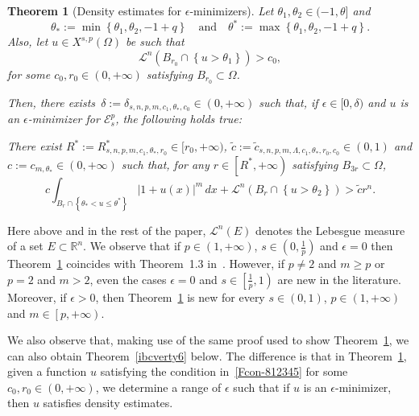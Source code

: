 \documentclass[12pt]{article}
\newcommand{\R}{\mathbb{R}}
\numberwithin{equation}{section}
\newtheorem{thm}{Theorem}[section]
\renewcommand{\leq}{\leqslant}
\renewcommand{\geq}{\geqslant}
\begin{document}
\begin{thm}[Density estimates for $\epsilon$-minimizers]\label{th:fracp>=2}
Let $\theta_1,\theta_2\in (-1,\theta]$ and 
\begin{equation}\label{liibfdcvre5555}
\theta_*:=\min \left\lbrace \theta_1,\theta_2,-1+q \right\rbrace\quad\mbox{and}\quad \theta^*:=\max\left\lbrace  \theta_1,\theta_2,-1+q\right\rbrace.
\end{equation}
Also, let $u\in X^{s,p}(\Omega)$ be such that
\begin{equation}\label{Fcon-812345}
\mathcal{L}^{n}(B_{r_0}\cap \left\lbrace u>\theta_1 \right\rbrace)>c_0,
\end{equation}
for some $c_0,r_0\in (0,+\infty)$ satisfying $B_{r_0}\subset \Omega$.

Then, there exists~$\delta:=\delta_{s,n,p,m,c_1,\theta_*,c_0}\in(0,+\infty)$ such that, if $\epsilon\in [0,\delta)$ and $u$ is an $\epsilon$-minimizer for $\mathcal{E}_s^p$, the following holds true:

There exist $R^*:=R_{s,n,p,m,c_1,\theta_*,r_0}^*\in [r_0,+\infty)$, $\tilde{c}:=\tilde{c}_{s,n,p,m,\Lambda,c_1,\theta_*,r_0,c_0}\in (0,1)$ and $c:=c_{m,\theta_*}\in (0,+\infty)$ such that, for any $r\in \left[R^*,+\infty\right)$ satisfying $B_{3r}\subset \Omega$,
\begin{equation}\label{benz}
c\int_{B_r\cap \left\lbrace \theta_{*}<u\leq \theta^* \right\rbrace}\left|1+u(x)\right|^m\,dx+\mathcal{L}^n(B_r\cap \left\lbrace u>\theta_2 \right\rbrace)>\tilde{c}r^n.
\end{equation}
\end{thm}

Here above and in the rest of the paper, $\mathcal{L}^n(E)$ denotes the Lebesgue measure of a set $E \subset \R^n$. We observe that if $p\in (1,+\infty)$, $s\in \left(0,\frac{1}{p}\right)$ and $\epsilon=0$ then Theorem~\ref{th:fracp>=2} coincides with Theorem~1.3 in~\cite{DFVERPP}. However, if $p\neq 2$ and $m\geq p$ or $p=2$ and $m>2$, even the cases $\epsilon=0$ and $s\in\left[\frac{1}{p},1\right)$ are new in the literature. Moreover, if $\epsilon>0$, then Theorem~\ref{th:fracp>=2} is new for every $s\in (0,1)$, $p\in (1,+\infty)$ and $m\in \left[p,+\infty\right)$.

\medskip


We also observe that, making use of the same proof used to show Theorem~\ref{th:fracp>=2}, we can also obtain Theorem~\ref{ibcverty6} below. The difference is that in Theorem~\ref{th:fracp>=2}, given a function $u$ satisfying the condition in~\eqref{Fcon-812345} for some $c_0,r_0\in (0,+\infty)$, we determine a range of $\epsilon$ such that if $u$ is an $\epsilon$-minimizer, then $u$ satisfies density estimates. 
\end{document}
